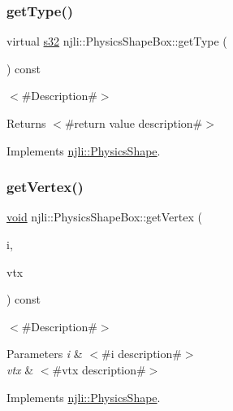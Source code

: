 \subsubsection{\texorpdfstring{get\+Type()}{getType()}}
{\footnotesize\ttfamily virtual \mbox{\hyperlink{_util_8h_aa62c75d314a0d1f37f79c4b73b2292e2}{s32}} njli\+::\+Physics\+Shape\+Box\+::get\+Type (\begin{DoxyParamCaption}{ }\end{DoxyParamCaption}) const\hspace{0.3cm}{\ttfamily [virtual]}}

$<$\#\+Description\#$>$

\begin{DoxyReturn}{Returns}
$<$\#return value description\#$>$ 
\end{DoxyReturn}


Implements \mbox{\hyperlink{classnjli_1_1_physics_shape_ac7c6b2ac373892095f8220d56f8ad6de}{njli\+::\+Physics\+Shape}}.

\mbox{\label{classnjli_1_1_physics_shape_box_af1045ee343d3434f0187c526bfc23fb5}} 
\subsubsection{\texorpdfstring{get\+Vertex()}{getVertex()}}
{\footnotesize\ttfamily \mbox{\hyperlink{_thread_8h_af1e856da2e658414cb2456cb6f7ebc66}{void}} njli\+::\+Physics\+Shape\+Box\+::get\+Vertex (\begin{DoxyParamCaption}\item[{int}]{i,  }\item[{bt\+Vector3 \&}]{vtx }\end{DoxyParamCaption}) const\hspace{0.3cm}{\ttfamily [virtual]}}

$<$\#\+Description\#$>$


\begin{DoxyParams}{Parameters}
{\em i} & $<$\#i description\#$>$ \\
\hline
{\em vtx} & $<$\#vtx description\#$>$ \\
\hline
\end{DoxyParams}


Implements \mbox{\hyperlink{classnjli_1_1_physics_shape_acb05a16bdbfa5cee6dcbab5c253eb78e}{njli\+::\+Physics\+Shape}}.

